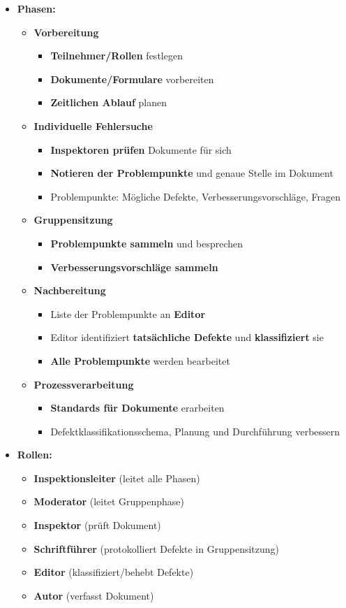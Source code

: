 		\begin{itemize}
			\item \textbf{Phasen:}
			\begin{itemize}
				\item \textbf{Vorbereitung}
				\begin{itemize}
					\item \textbf{Teilnehmer/Rollen} festlegen
					\item \textbf{Dokumente/Formulare} vorbereiten
					\item \textbf{Zeitlichen Ablauf} planen
				\end{itemize}
				\item \textbf{Individuelle Fehlersuche}
				\begin{itemize}
					\item \textbf{Inspektoren prüfen} Dokumente für sich
					\item \textbf{Notieren der Problempunkte} und genaue Stelle im Dokument
					\item Problempunkte: Mögliche Defekte, Verbesserungsvorschläge, Fragen
				\end{itemize}
				\item \textbf{Gruppensitzung}
				\begin{itemize}
					\item \textbf{Problempunkte sammeln} und besprechen
					\item \textbf{Verbesserungsvorschläge sammeln}
				\end{itemize}
				\item \textbf{Nachbereitung}
				\begin{itemize}
					\item Liste der Problempunkte an \textbf{Editor}
					\item Editor identifiziert \textbf{tatsächliche Defekte} und \textbf{klassifiziert} sie
					\item \textbf{Alle Problempunkte} werden bearbeitet
				\end{itemize}
				\item \textbf{Prozessverarbeitung}
				\begin{itemize}
					\item \textbf{Standards für Dokumente} erarbeiten
					\item Defektklassifikationsschema, Planung und Durchführung verbessern
				\end{itemize}
			\end{itemize}
			\newpage
			\item \textbf{Rollen:}
			\begin{itemize}
				\item \textbf{Inspektionsleiter} (leitet alle Phasen)
				\item \textbf{Moderator} (leitet Gruppenphase)
				\item \textbf{Inspektor} (prüft Dokument)
				\item \textbf{Schriftführer} (protokolliert Defekte in Gruppensitzung)
				\item \textbf{Editor} (klassifiziert/behebt Defekte)
				\item \textbf{Autor} (verfasst Dokument)
			\end{itemize}
		\end{itemize}	
